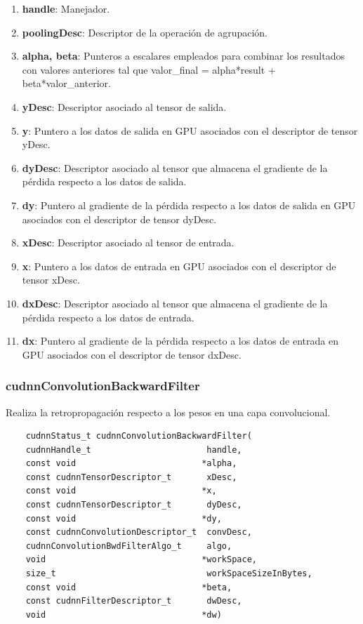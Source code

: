 \begin{enumerate}
	\item \textbf{handle}: Manejador.
	\item \textbf{poolingDesc}: Descriptor de la operación de agrupación.
	\item \textbf{alpha, beta}: Punteros a escalares empleados para combinar los resultados con valores anteriores tal que valor\_final = alpha*result + beta*valor\_anterior.
	\item \textbf{yDesc}: Descriptor asociado al tensor de salida.
	\item \textbf{y}: Puntero a los datos de salida en GPU asociados con el descriptor de tensor yDesc.
	\item \textbf{dyDesc}: Descriptor asociado al tensor que almacena el gradiente de la pérdida respecto a los datos de salida.
	\item \textbf{dy}: Puntero al gradiente de la pérdida respecto a los datos de salida en GPU asociados con el descriptor de tensor dyDesc.
	\item \textbf{xDesc}: Descriptor asociado al tensor de entrada.
	\item \textbf{x}: Puntero a los datos de entrada en GPU asociados con el descriptor de tensor xDesc.
	\item \textbf{dxDesc}: Descriptor asociado al tensor que almacena el gradiente de la pérdida respecto a los datos de entrada.
	\item \textbf{dx}: Puntero al gradiente de la pérdida respecto a los datos de entrada en GPU asociados con el descriptor de tensor dxDesc.	
\end{enumerate}
\cite{cuDNN_pool_fwd}

\subsubsection{cudnnConvolutionBackwardFilter}
Realiza la retropropagación respecto a los pesos en una capa convolucional.

\begin{verbatim}
	cudnnStatus_t cudnnConvolutionBackwardFilter(
	cudnnHandle_t                       handle,
	const void                         *alpha,
	const cudnnTensorDescriptor_t       xDesc,
	const void                         *x,
	const cudnnTensorDescriptor_t       dyDesc,
	const void                         *dy,
	const cudnnConvolutionDescriptor_t  convDesc,
	cudnnConvolutionBwdFilterAlgo_t     algo,
	void                               *workSpace,
	size_t                              workSpaceSizeInBytes,
	const void                         *beta,
	const cudnnFilterDescriptor_t       dwDesc,
	void                               *dw)
\end{verbatim}

